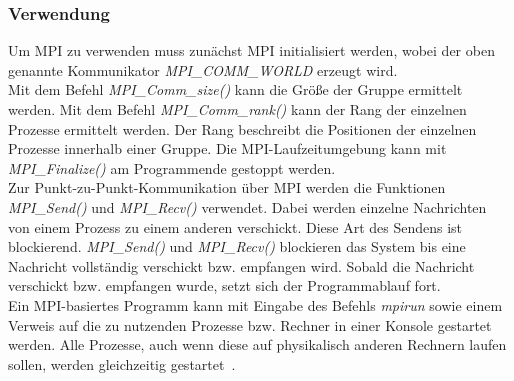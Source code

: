 \subsubsection{Verwendung} Um MPI zu verwenden muss zunächst MPI initialisiert werden, wobei der oben genannte Kommunikator \textit{MPI\_COMM\_WORLD} erzeugt wird.\\
Mit dem Befehl \textit{MPI\_Comm\_size()} kann die Größe der Gruppe ermittelt werden. Mit dem Befehl \textit{MPI\_Comm\_rank()} kann der Rang der einzelnen Prozesse ermittelt werden. Der Rang beschreibt die Positionen der einzelnen Prozesse innerhalb einer Gruppe.
Die MPI-Laufzeitumgebung kann mit \textit{MPI\_Finalize()} am Programmende gestoppt werden.\\
Zur Punkt-zu-Punkt-Kommunikation über MPI werden die Funktionen \textit{MPI\_Send()} und \textit{MPI\_Recv()} verwendet. Dabei werden einzelne Nachrichten von einem Prozess zu einem anderen verschickt. Diese Art des Sendens ist blockierend. \textit{MPI\_Send()} und \textit{MPI\_Recv()} blockieren das System bis eine Nachricht vollständig verschickt bzw. empfangen wird. Sobald die Nachricht verschickt bzw. empfangen wurde, setzt sich der Programmablauf fort. \\
Ein MPI-basiertes Programm kann mit Eingabe des Befehls \textit{mpirun} sowie einem Verweis auf die zu nutzenden Prozesse bzw. Rechner in einer Konsole gestartet werden. Alle Prozesse, auch wenn diese auf physikalisch anderen Rechnern laufen sollen, werden gleichzeitig gestartet~\cite{b1}.